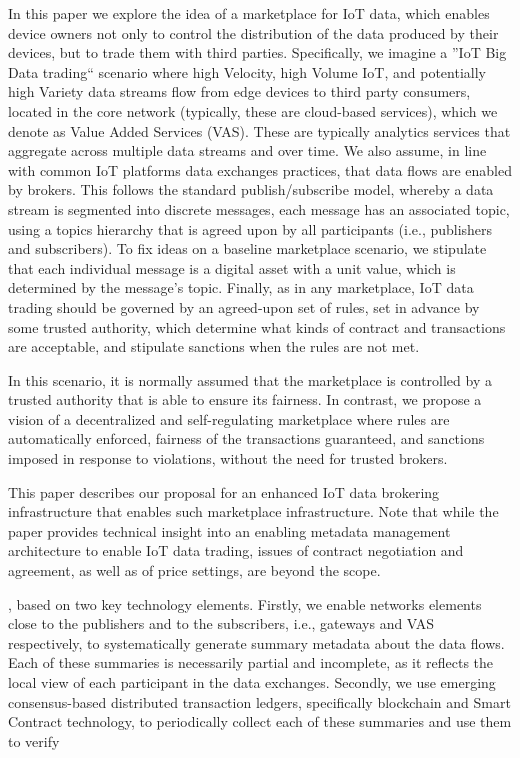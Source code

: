 \documentclass[conference]{IEEEtran}
\begin{document}


In this paper we explore the idea of a marketplace for IoT data, which enables device owners not only to control the distribution of the data produced by their devices, but to trade them with third parties.
%
Specifically, we imagine a ''IoT Big Data trading`` scenario where high Velocity, high Volume IoT, and potentially high Variety data streams flow from edge devices to third party consumers, located in the core network (typically, these are cloud-based services), which we denote as Value Added Services (VAS). These are typically analytics services that aggregate across multiple data streams and over time.
%
We also assume, in line with common IoT platforms data exchanges practices, that data flows are enabled by brokers. This follows the standard publish/subscribe model, whereby a data stream is segmented into discrete messages, each message has an associated topic, using a topics hierarchy that is agreed upon by all participants (i.e., publishers and subscribers).
%
To fix ideas on a baseline marketplace scenario, we stipulate that each individual message is a digital asset with a unit value, which is determined by the message's topic.
%
Finally, as in any marketplace, IoT data trading should be governed by an agreed-upon set of rules, set in advance by some trusted authority, which determine what kinds of contract and transactions are acceptable, and stipulate sanctions when the rules are not met.

In this scenario, it is normally assumed that the marketplace is controlled by a trusted authority that is able to ensure its fairness.
In contrast, we propose a vision of a decentralized and self-regulating marketplace where rules are automatically enforced,  fairness of the transactions guaranteed, and sanctions imposed in response to violations, without the need for trusted brokers.

This paper describes our proposal for an enhanced IoT data brokering infrastructure that enables such marketplace infrastructure.
Note that while the paper provides technical insight into an enabling metadata management architecture to enable IoT data trading, issues of contract negotiation and agreement, as well as of price settings, are beyond the scope.

, based on two key technology elements.
%
Firstly, we enable networks elements close to the publishers and to the subscribers, i.e., gateways and VAS respectively, to systematically generate summary metadata about the data flows. 
Each of these summaries is necessarily partial and incomplete, as it reflects the local view of each participant in the data exchanges.
%
Secondly, we use emerging consensus-based distributed transaction ledgers, specifically blockchain and Smart Contract technology, to periodically collect each of these summaries and use them to verify 
\end{document}
